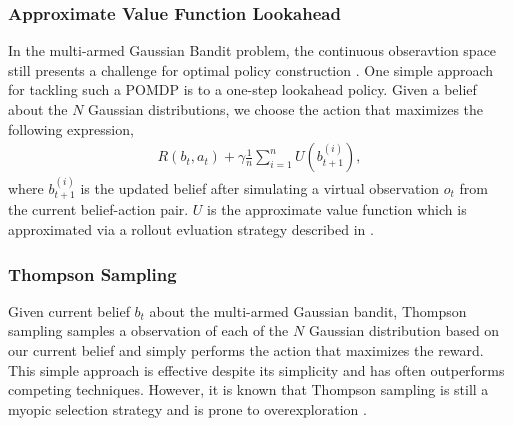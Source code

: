 \documentclass{article}
\begin{document}
\subsubsection{Approximate Value Function Lookahead}
In the multi-armed Gaussian Bandit problem, the continuous obseravtion space still presents a challenge for optimal policy construction \cite{sparse}. One simple approach for tackling such a POMDP is to a one-step lookahead policy. Given a belief about the $N$ Gaussian distributions, we choose the action that maximizes the following expression,
\begin{align}
  R(b_t, a_t) + \gamma \frac{1}{n} \sum_{i=1}^n U(b_{t+1}^{(i)}),
\end{align}
where $b_{t+1}^{(i)}$ is the updated belief after simulating a virtual observation $o_t$ from the current belief-action pair. $U$ is the approximate value function which is approximated via a rollout evluation strategy described in \cite{mykel}. 

\subsubsection{Thompson Sampling}
Given current belief $b_t$ about the multi-armed Gaussian bandit, Thompson sampling samples a observation of each of the $N$ Gaussian distribution based on our current belief and simply performs the action that maximizes the reward. This simple approach is effective despite its simplicity and has often outperforms competing techniques. However, it is known that Thompson sampling is still a myopic selection strategy and is prone to overexploration \cite{sparse}.
\end{document}
